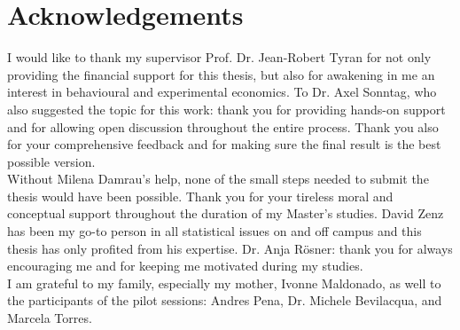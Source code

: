 \chapter*{Acknowledgements}

 I would like to thank my supervisor Prof. Dr. Jean-Robert Tyran for not only providing the financial support for this thesis, but also for awakening in me an interest in behavioural and experimental economics. To Dr. Axel Sonntag, who also suggested the topic for this work: thank you for providing hands-on support and for allowing open discussion throughout the entire process. Thank you also for your comprehensive feedback and for making sure the final result is the best possible version.\\

Without Milena Damrau’s help, none of the small steps needed to submit the thesis would have been possible. Thank you for your tireless moral and conceptual support throughout the duration of my Master’s studies. David Zenz has been my go-to person in all statistical issues on and off campus and this thesis has only profited from his expertise. Dr. Anja Rösner: thank you for always encouraging me and for keeping me motivated during my studies.\\

I am grateful to my family, especially my mother, Ivonne Maldonado, as well to the participants of the pilot sessions: Andres Pena, Dr. Michele Bevilacqua, and Marcela Torres.